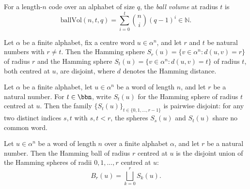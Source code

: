 \begin{definition}
\label{CommunicationComplexity.ballVol}
\leanok
{}
For a length-$n$ code over an alphabet of size $q$, the \emph{ball volume} at radius $t$ is
\[
  \mathrm{ballVol}(n,t,q) = \sum_{i=0}^{t} \binom{n}{i}(q-1)^i \in \mathbb{N}.
\]
\end{definition}

\begin{lemma}
\label{CommunicationComplexity.hammingSpheres_disjoint}
\leanok
{}
Let $\alpha$ be a finite alphabet, fix a centre word $u \in \alpha^n$, and let $r$ and
$t$ be natural numbers with $r \ne t$. Then the Hamming sphere $S_r(u) = \{v \in
\alpha^n : d(u,v) = r\}$ of radius $r$ and the Hamming sphere $S_t(u) = \{v \in \alpha^n
: d(u,v) = t\}$ of radius $t$, both centred at $u$, are disjoint, where $d$ denotes the
Hamming distance.
\end{lemma}

\begin{lemma}
\label{CommunicationComplexity.hammingSpheres_pairwise_disjoint}
\leanok
{}
Let $\alpha$ be a finite alphabet, let $u \in \alpha^n$ be a word of length $n$, and let
$r$ be a natural number. For $t \in \bbn$, write $S_t(u)$ for the Hamming sphere of
radius $t$ centred at $u$. Then the family $\{S_t(u)\}_{t \in \{0,1,\ldots,r-1\}}$ is
pairwise disjoint: for any two distinct indices $s, t$ with $s, t < r$, the spheres
$S_s(u)$ and $S_t(u)$ share no common word.
\end{lemma}

\begin{lemma}
\label{CommunicationComplexity.hammingBall_eq_hammingSpheres}
\leanok
{}
Let $u \in \alpha^n$ be a word of length $n$ over a finite alphabet $\alpha$, and let
$r$ be a natural number. Then the Hamming ball of radius $r$ centred at $u$ is the
disjoint union of the Hamming spheres of radii $0, 1, \dots, r$ centred at $u$:
\[
  B_r(u) = \bigsqcup_{k=0}^{r} S_k(u).
\]
\end{lemma}

